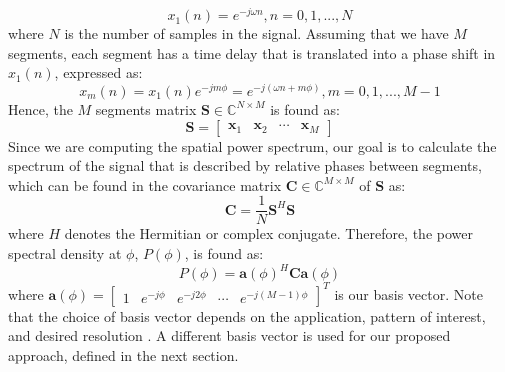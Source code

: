 \begin{equation}
x_1(n) = e^{-j\omega n} , n=0,1,...,N
\end{equation}
where $N$ is the number of samples in the signal. Assuming that we have $M$ segments, each segment has a time delay that is translated into a phase shift in $x_1(n)$, expressed as:
\begin{equation}
x_m(n) = x_1(n)e^{-jm\phi} =e^{-j(\omega n + m\phi)} , m=0,1,...,M-1
\end{equation}
Hence, the $M$ segments matrix $\textbf{S}\in \mathbb{C}^{N\times M}$ is found as:
\begin{equation}
    \textbf{S} = \begin{bmatrix} \textbf{x}_{1} & \textbf{x}_{2} & \cdots & \textbf{x}_{M}  \end{bmatrix}
\end{equation}
Since we are computing the spatial power spectrum, our goal is to calculate the spectrum of the signal that is described by relative phases between segments, which can be found in the covariance matrix $\textbf{C}\in \mathbb{C}^{M\times M}$ of $\textbf{S}$ as:
\begin{equation}
    \textbf{C}= \frac{1}{N}\textbf{S}^H\textbf{S}
\end{equation}
where $H$ denotes the Hermitian or complex conjugate. Therefore, the power spectral density at $\phi$, $P(\phi)$, is found as:
\begin{equation}
    P(\phi) = \textbf{a}(\phi)^H\textbf{C}\textbf{a}(\phi)
\end{equation}
where $\textbf{a}(\phi) = \begin{bmatrix} 1 & e^{-j\phi} & e^{-j2\phi} & \cdots & e^{-j(M-1)\phi}  \end{bmatrix}^T$ is our basis vector. Note that the choice of basis vector depends on the application, pattern of interest, and desired resolution \cite{priestley1981spectral}. A different basis vector is used for our proposed approach, defined in the next section.


